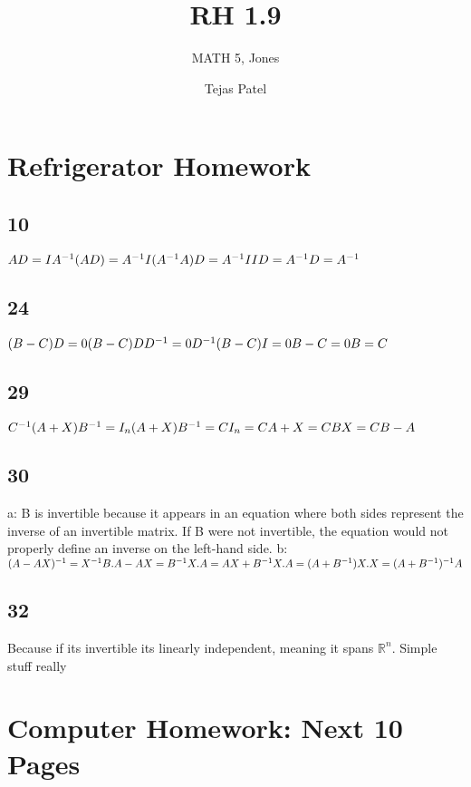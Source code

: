 \documentclass{article}
\title{RH 1.9}
\author{MATH 5, Jones}
\date{Tejas Patel}
\begin{document}
\maketitle
\section*{Refrigerator Homework}
\subsection*{10}
$AD = I 
\\A^{-1} (AD) = A^{-1} I
\\(A^{-1} A) D = A^{-1} I
\\I D = A^{-1}
\\D = A^{-1}$
\subsection*{24}
$(B - C)D = 0
\\(B - C)D D^{-1} = 0 D^{-1}
\\(B - C)I = 0
\\B - C = 0
\\B=C$
\subsection*{29}
$C^{-1} (A + X) B^{-1} = I_n
\\(A + X) B^{-1} = C I_n = C
\\A + X = CB
\\X = CB - A$
\subsection*{30}

a: B  is invertible because it appears in an equation where both sides represent the inverse of an invertible matrix. If  B  were not invertible, the equation would not properly define an inverse on the left-hand side.
b: $(A - AX)^{-1} = X^{-1} B.
\\A - AX = B^{-1} X.
\\A = AX + B^{-1} X.
\\A = (A + B^{-1})X.
\\X = (A + B^{-1})^{-1} A$
\subsection*{32}
Because if its invertible its linearly independent, meaning it spans $\mathbb{R}^n$. Simple stuff really
\pagebreak \section*{Computer Homework: Next 10 Pages}
\end{document}

